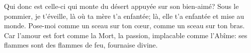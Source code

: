 Qui donc est celle-ci qui monte du désert appuyée sur son bien-aimé?
Sous le pommier, je t’éveille, là où ta mère t’a enfantée;
	là, elle t’a enfantée et mise au monde.
Pose-moi comme un sceau sur ton cœur, comme un sceau sur ton bras.
Car l’amour est fort comme la Mort, la passion, implacable comme l’Abîme:
	ses flammes sont des flammes de feu, fournaise divine.
